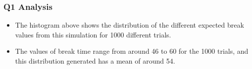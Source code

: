 \documentclass[11pt]{article}
\makeatletter
\providecommand{\tightlist}{%
      \setlength{\itemsep}{0pt}\setlength{\parskip}{0pt}}
\newcommand{\boxspacing}{\kern\kvtcb@left@rule\kern\kvtcb@boxsep}
\newcommand{\prompt}[4]{
        \ttfamily\llap{{\color{#2}[#3]:\hspace{3pt}#4}}\vspace{-\baselineskip}
    }
\makeatother
\begin{document}
    \hypertarget{q1-analysis}{%
\subsubsection{Q1 Analysis}\label{q1-analysis}}

\begin{itemize}
\tightlist
\item
  The histogram above shows the distribution of the different expected
  break values from this simulation for 1000 different trials.
\item
  The values of break time range from around 46 to 60 for the 1000
  trials, and this distribution generated has a mean of around 54.
\end{itemize}

    \begin{tcolorbox}[breakable, size=fbox, boxrule=1pt, pad at break*=1mm,colback=cellbackground, colframe=cellborder]
\prompt{In}{incolor}{ }{\boxspacing}
\begin{Verbatim}[commandchars=\\\{\}]

\end{Verbatim}
\end{tcolorbox}


    
    
    
\end{document}
